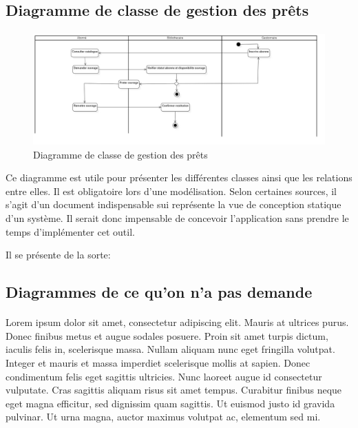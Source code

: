\subsection{Diagramme de classe de gestion des prêts}
\paragraph{}
\begin{figure}[h]
        \centering
        \includegraphics[width=1\textwidth]{ActivityDiagram1}
        \caption{Diagramme de classe de gestion des prêts}
        \label{image-ActivityDiagram1}
        \end{figure}
\par
Ce diagramme est utile pour présenter les différentes classes ainsi que les relations 
entre elles. Il est obligatoire lors d'une modélisation. Selon certaines sources, il 
s'agit d'un document indispensable sui représente la vue de conception statique 
d'un système. Il serait donc impensable de concevoir l'application sans prendre le temps 
d'implémenter cet outil.
\par 
Il se présente de la sorte: \par 

\subsection{Diagrammes de ce qu'on n'a pas demande}
\paragraph{} 
Lorem ipsum dolor sit amet, consectetur adipiscing elit. Mauris at ultrices purus. Donec finibus metus et augue sodales posuere. Proin sit amet turpis dictum, iaculis felis in, scelerisque massa. Nullam aliquam nunc eget fringilla volutpat. Integer et mauris et massa imperdiet scelerisque mollis at sapien. Donec condimentum felis eget sagittis ultricies. Nunc laoreet augue id consectetur vulputate. Cras sagittis aliquam risus sit amet tempus. Curabitur finibus neque eget magna efficitur, sed dignissim quam sagittis. Ut euismod justo id gravida pulvinar. Ut urna magna, auctor maximus volutpat ac, elementum sed mi.

